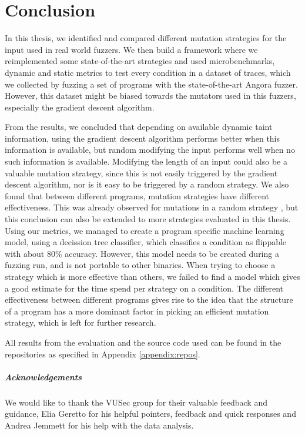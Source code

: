 
\chapter{Conclusion}\label{chap:conclusion} %





% 
In this thesis, we identified and compared different mutation strategies for the input used in real world fuzzers. We then build a framework where we reimplemented some state-of-the-art strategies and used microbenchmarks, dynamic and static metrics to test every condition in a dataset of traces, which we collected by fuzzing a set of programs with the state-of-the-art Angora fuzzer. However, this dataset might be biased towards the mutators used in this fuzzers, especially the gradient descent algorithm.

From the results, we concluded that depending on available dynamic taint information, using the gradient descent algorithm performs better when this information is available, but random modifying the input performs well when no such information is available. Modifying the length of an input could also be a valuable mutation strategy, since this is not easily triggered by the gradient descent algorithm, nor is it easy to be triggered by a random strategy.
We also found that between different programs, mutation strategies have different effectiveness. This was already observed for mutations in a random strategy \cite{lyu2019mopt}, but this conclusion can also be extended to more strategies evaluated in this thesis. 
Using our metrics, we managed to create a program specific machine learning model, using a decission tree classifier, which classifies a condition as flippable with about 80\% accuracy. However, this model needs to be created during a fuzzing run, and is not portable to other binaries.
When trying to choose a strategy which is more effective than others, we failed to find a model which gives a good estimate for the time spend per strategy on a condition.
The different effectiveness between different programs gives rise to the idea that the structure of a program has a more dominant factor in picking an efficient mutation strategy, which is left for further research.

All results from the evaluation and the source code used can be found in the repositories as specified in Appendix \ref{appendix:repos}.

\paragraph*{Acknowledgements}
We would like to thank the VUSec group for their valuable feedback and guidance, Elia Geretto for his helpful pointers, feedback and quick responses and Andrea Jemmett for his help with the data analysis.

